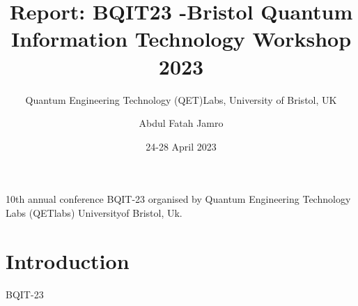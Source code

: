 \documentclass[a4paper, 12pt]{scrartcl}
\title{Report: BQIT23 -Bristol Quantum Information Technology Workshop 2023}
\subtitle{Quantum Engineering Technology (QET)Labs, University of Bristol, UK}
\author{Abdul Fatah Jamro}
\date{24-28 April 2023 }
\begin{document}
\maketitle
  10th annual conference BQIT-23 organised by Quantum Engineering Technology
  Labs (QETlabs) Universityof Bristol, Uk.

\section{Introduction}
  BQIT-23 
\end{document}
